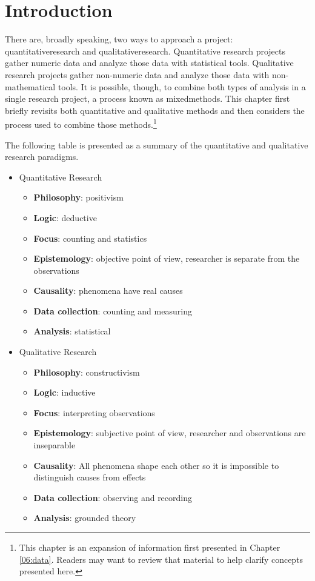 \section{Introduction}

There are, broadly speaking, two ways to approach a project: \gls{quantitativeresearch} and \gls{qualitativeresearch}. Quantitative research projects gather numeric data and analyze those data with statistical tools. Qualitative research projects gather non-numeric data and analyze those data with non-mathematical tools. It is possible, though, to combine both types of analysis in a single research project, a process known as \gls{mixedmethods}. This chapter first briefly revisits both quantitative and qualitative methods and then considers the process used to combine those methods.\footnote{This chapter is an expansion of information first presented in Chapter \ref{06:data}. Readers may want to review that material to help clarify concepts presented here.}

The following table is presented as a summary of the quantitative and qualitative research paradigms.

\begin{itemize}
	\item Quantitative Research
	\begin{itemize}
		\item \textbf{Philosophy}: positivism
		\item \textbf{Logic}: deductive
		\item \textbf{Focus}: counting and statistics
		\item \textbf{Epistemology}: objective point of view, researcher is separate from the observations
		\item \textbf{Causality}: phenomena have real causes
		\item \textbf{Data collection}: counting and measuring
		\item \textbf{Analysis}: statistical
	\end{itemize}
	\item Qualitative Research
	\begin{itemize}
		\item \textbf{Philosophy}: constructivism
		\item \textbf{Logic}: inductive
		\item \textbf{Focus}: interpreting observations
		\item \textbf{Epistemology}: subjective point of view, researcher and observations are inseparable
		\item \textbf{Causality}: All phenomena shape each other so it is impossible to distinguish causes from effects
		\item \textbf{Data collection}: observing and recording
		\item \textbf{Analysis}: grounded theory
	\end{itemize}
	
\end{itemize}

